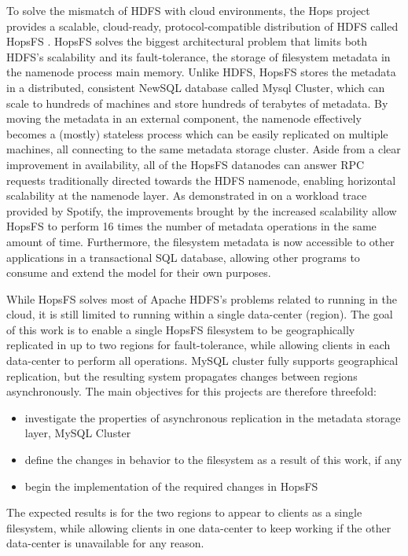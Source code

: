 To solve the mismatch of HDFS with cloud environments, the Hops project provides a scalable, cloud-ready, protocol-compatible distribution of HDFS called HopsFS \cite{DBLP:conf/dais/NiaziIBD15}.
HopsFS solves the biggest architectural problem that limits both HDFS's scalability and its fault-tolerance, the storage of filesystem metadata in the namenode process main memory.
Unlike HDFS, HopsFS stores the metadata in a distributed, consistent NewSQL database called Mysql Cluster, which can scale to hundreds of machines and store hundreds of terabytes of metadata.
By moving the metadata in an external component, the namenode effectively becomes a (mostly) stateless process which can be easily replicated on multiple machines, all connecting to the same metadata storage cluster.
Aside from a clear improvement in availability, all of the HopsFS datanodes can answer RPC requests traditionally directed towards the HDFS namenode, enabling horizontal scalability at the namenode layer.
As demonstrated in \cite{DBLP:conf/dais/NiaziIBD15} on a workload trace provided by Spotify, the improvements brought by the increased scalability allow HopsFS to perform 16 times the number of metadata operations in the same amount of time.
Furthermore, the filesystem metadata is now accessible to other applications in a transactional SQL database, allowing other programs to consume and extend the model for their own purposes.

While HopsFS solves most of Apache HDFS's problems related to running in the cloud, it is still limited to running within a single data-center (region).
The goal of this work is to enable a single HopsFS filesystem to be geographically replicated in up to two regions for fault-tolerance, while allowing clients in each data-center to perform all operations.
MySQL cluster fully supports geographical replication, but the resulting system propagates changes between regions asynchronously.
The main objectives for this projects are therefore threefold:
\begin{itemize}
    \item investigate the properties of asynchronous replication in the metadata storage layer, MySQL Cluster
    \item define the changes in behavior to the filesystem as a result of this work, if any
    \item begin the implementation of the required changes in HopsFS
\end{itemize}
The expected results is for the two regions to appear to clients as a single filesystem, while allowing clients in one data-center to keep working if the other data-center is unavailable for any reason.

